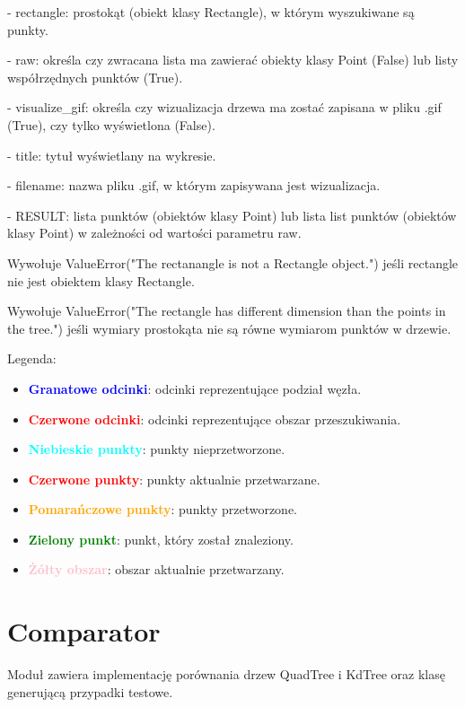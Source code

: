 \documentclass{lab}
\begin{document}
\begin{itemize}
  - rectangle: prostokąt (obiekt klasy Rectangle), w którym wyszukiwane są punkty.

  - raw: określa czy zwracana lista ma zawierać obiekty klasy Point (False) lub listy współrzędnych punktów (True).

  - visualize\_gif: określa czy wizualizacja drzewa ma zostać zapisana w pliku .gif (True), czy tylko wyświetlona (False).

  - title: tytuł wyświetlany na wykresie.

  - filename: nazwa pliku .gif, w którym zapisywana jest wizualizacja.

  - RESULT: lista punktów (obiektów klasy Point) lub lista list punktów (obiektów klasy Point) w zależności od wartości parametru raw.

  Wywołuje ValueError("The rectanangle is not a Rectangle object.") jeśli rectangle nie jest obiektem klasy Rectangle.

  Wywołuje ValueError("The rectangle has different dimension than the points in the tree.") jeśli wymiary prostokąta nie są równe wymiarom punktów w drzewie.

  Legenda:
  \begin{itemize}
      \item \textbf{\textcolor{blue}{Granatowe odcinki}}: odcinki reprezentujące podział węzła.
      \item \textbf{\textcolor{red}{Czerwone odcinki}}: odcinki reprezentujące obszar przeszukiwania.
      \item \textbf{\textcolor{cyan}{Niebieskie punkty}}: punkty nieprzetworzone.
      \item \textbf{\textcolor{red}{Czerwone punkty}}: punkty aktualnie przetwarzane.
      \item \textbf{\textcolor{orange}{Pomarańczowe punkty}}: punkty przetworzone.
      \item \textbf{\textcolor{green}{Zielony punkt}}: punkt, który został znaleziony.
      \item \textbf{\textcolor{pink}{Żółty obszar}}: obszar aktualnie przetwarzany.
  \end{itemize}
\end{itemize}

\section{Comparator}
Moduł zawiera implementację porównania drzew QuadTree i KdTree oraz klasę generującą przypadki testowe.
\end{document}
